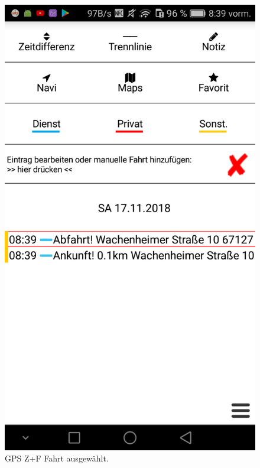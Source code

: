 \begin{figure}[H]
\begin{minipage}[b]{.4\linewidth}
        \includegraphics[scale=0.14]{img/gps2}
        \caption{\label{img:img/gps2}GPS Z+F Fahrt ausgewählt.}
    \end{minipage}
\end{figure}

